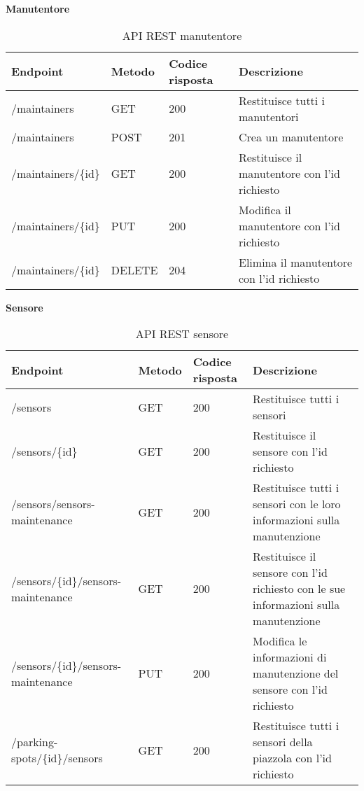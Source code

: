 \clearpage
\leavevmode\newline
\textbf{Manutentore}
\\
\begin{table}[H]
    \begin{tabular}{|p{3.2cm}|p{1.4cm}|p{1.4cm}|p{5.8cm}|} 
    \hline
    \textbf{Endpoint} & \textbf{Metodo} & \textbf{Codice risposta} & \textbf{Descrizione} \\ 
    \hline
    /maintainers & GET & 200 & Restituisce tutti i manutentori \\ 
    \hline
    /maintainers & POST & 201 & Crea un manutentore \\ 
    \hline
    /maintainers/\{id\} & GET & 200 & Restituisce il manutentore con l'id richiesto \\ 
    \hline
    /maintainers/\{id\} & PUT & 200 & Modifica il manutentore con l'id richiesto \\ 
    \hline
    /maintainers/\{id\} & DELETE & 204 & Elimina il manutentore con l'id richiesto \\ 
    \hline
    \end{tabular}
    \caption{API REST manutentore}
\end{table}
\leavevmode\newline
\textbf{Sensore}
\\
\begin{table}[H]
    \begin{tabular}{|p{3.2cm}|p{1.4cm}|p{1.4cm}|p{5.8cm}|} 
    \hline
    \textbf{Endpoint} & \textbf{Metodo} & \textbf{Codice risposta} & \textbf{Descrizione} \\ 
    \hline
    /sensors & GET & 200 & Restituisce tutti i sensori \\ 
    \hline
    /sensors/\{id\} & GET & 200 & Restituisce il sensore con l'id richiesto \\ 
    \hline
    /sensors/sensors-maintenance & GET & 200 & Restituisce tutti i sensori con le loro informazioni sulla 
        manutenzione \\ 
    \hline
    /sensors/\{id\}/sensors-maintenance & GET & 200 & Restituisce il sensore con l'id richiesto con le sue 
        informazioni sulla manutenzione \\ 
    \hline
    /sensors/\{id\}/sensors-maintenance & PUT & 200 & Modifica le informazioni di manutenzione del sensore con
        l'id richiesto \\ 
    \hline
    /parking-spots/\{id\}/sensors & GET & 200 & Restituisce tutti i sensori della piazzola con l'id richiesto \\ 
    \hline
    \end{tabular}
    \caption{API REST sensore}
\end{table}
